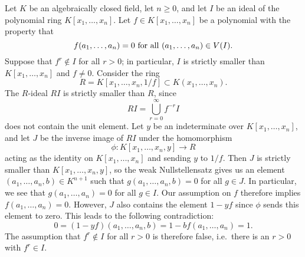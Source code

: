 \documentclass[12pt]{article}
\begin{document}
Let $K$ be an algebraically closed field, let $n\ge 0$, and let $I$ be an ideal of the polynomial ring $K[x_1,\ldots,x_n]$.  Let $f\in K[x_1,\ldots,x_n]$ be
a polynomial with the property that
$$
f(a_1,\ldots,a_n)=0\hbox{ for all }(a_1,\ldots,a_n)\in V(I).
$$
Suppose that $f^r\not\in I$ for all $r>0$; in particular, $I$ is strictly smaller than $K[x_1,\ldots,x_n]$ and $f\ne 0$.  Consider the ring
$$
R=K[x_1,\ldots,x_n,1/f]\subset K(x_1,\ldots,x_n).
$$
The $R$-ideal $RI$ is strictly smaller than $R$, since
$$
RI=\bigcup_{r=0}^\infty f^{-r}I
$$
does not contain the unit element.  Let $y$ be an indeterminate over
$K[x_1,\ldots,x_n]$, and let $J$ be the inverse image of $RI$ under
the homomorphism
$$
\phi\colon K[x_1,\ldots,x_n,y]\to R
$$
acting as the identity on $K[x_1,\ldots,x_n]$ and sending $y$ to
$1/f$.  Then $J$ is strictly smaller than $K[x_1,\ldots,x_n,y]$, so
the weak Nullstellensatz gives us an element $(a_1,\ldots,a_n,b)\in                       
K^{n+1}$ such that $g(a_1,\ldots,a_n,b)=0$ for all $g\in J$.  In
particular, we see that $g(a_1,\ldots,a_n)=0$ for all $g\in I$.  Our
assumption on $f$ therefore implies $f(a_1,\ldots,a_n)=0$.  However,
$J$ also contains the element $1-yf$ since $\phi$ sends this element
to zero.  This leads to the following contradiction:
$$
0=(1-yf)(a_1,\ldots,a_n,b)=1-bf(a_1,\ldots,a_n)=1.
$$
The assumption that $f^r\not\in I$ for all $r>0$ is therefore false,
i.e.~there is an $r>0$ with $f^r\in I$.
\end{document}
